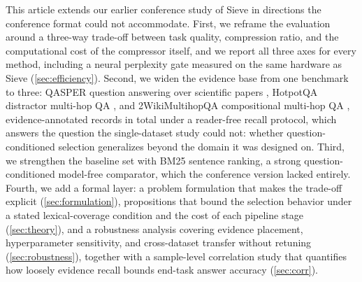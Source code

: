 \documentclass[preprint,12pt]{elsarticle}
\theoremstyle{remark}
\newcommand{\method}{Sieve}
\begin{document}
This article extends our earlier conference study of \method{} in
directions the conference format could not accommodate. First, we
reframe the evaluation around a three-way trade-off between task
quality, compression ratio, and the computational cost of the
compressor itself, and we report all three axes for every method,
including a neural perplexity gate measured on the same hardware as
\method{} (\autoref{sec:efficiency}). Second, we widen the evidence
base from one benchmark to three: QASPER question answering over
scientific papers \citep{dasigi2021qasper}, HotpotQA distractor
multi-hop QA \citep{yang2018hotpotqa}, and 2WikiMultihopQA
compositional multi-hop QA \citep{ho2020wiki}, \TotalRecords{}
evidence-annotated records in total under a reader-free recall
protocol, which answers the question the single-dataset study could
not: whether question-conditioned selection generalizes beyond the
domain it was designed on. Third, we strengthen the baseline set with
BM25 sentence ranking, a strong question-conditioned model-free
comparator, which the conference version lacked entirely. Fourth, we
add a formal layer: a problem formulation that makes the trade-off
explicit (\autoref{sec:formulation}), propositions that bound the
selection behavior under a stated lexical-coverage condition and the
cost of each pipeline stage (\autoref{sec:theory}), and a robustness
analysis covering evidence placement, hyperparameter sensitivity, and
cross-dataset transfer without retuning (\autoref{sec:robustness}),
together with a sample-level correlation study that quantifies how
loosely evidence recall bounds end-task answer accuracy
(\autoref{sec:corr}).
\end{document}
